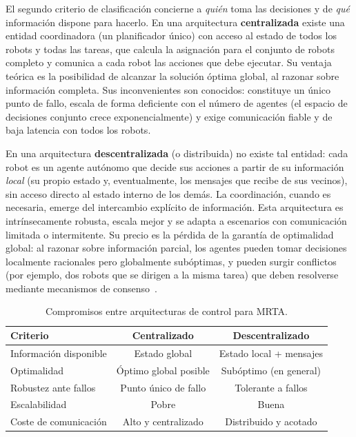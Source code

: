 El segundo criterio de clasificación concierne a \emph{quién} toma las decisiones y de \emph{qué} información dispone para hacerlo. En una arquitectura \textbf{centralizada} existe una entidad coordinadora (un planificador único) con acceso al estado de todos los robots y todas las tareas, que calcula la asignación para el conjunto de robots completo y comunica a cada robot las acciones que debe ejecutar. Su ventaja teórica es la posibilidad de alcanzar la solución óptima global, al razonar sobre información completa. Sus inconvenientes son conocidos: constituye un único punto de fallo, escala de forma deficiente con el número de agentes (el espacio de decisiones conjunto crece exponencialmente) y exige comunicación fiable y de baja latencia con todos los robots.

En una arquitectura \textbf{descentralizada} (o distribuida) no existe tal entidad: cada robot es un agente autónomo que decide sus acciones a partir de su información \emph{local} (su propio estado y, eventualmente, los mensajes que recibe de sus vecinos), sin acceso directo al estado interno de los demás. La coordinación, cuando es necesaria, emerge del intercambio explícito de información. Esta arquitectura es intrínsecamente robusta, escala mejor y se adapta a escenarios con comunicación limitada o intermitente. Su precio es la pérdida de la garantía de optimalidad global: al razonar sobre información parcial, los agentes pueden tomar decisiones localmente racionales pero globalmente subóptimas, y pueden surgir conflictos (por ejemplo, dos robots que se dirigen a la misma tarea) que deben resolverse mediante mecanismos de consenso~\cite{dias2006market}. 

\begin{table}[t] \centering \caption{Compromisos entre arquitecturas de control para MRTA.} \label{tab:cent-vs-desc} \begin{tabular}{lcc} \hline \textbf{Criterio} & \textbf{Centralizado} & \textbf{Descentralizado} \\ \hline Información disponible      & Estado global & Estado local + mensajes \\ Optimalidad         & Óptimo global posible & Subóptimo (en general) \\ Robustez ante fallos        & Punto único de fallo  & Tolerante a fallos \\ Escalabilidad       & Pobre         & Buena \\ Coste de comunicación       & Alto y centralizado   & Distribuido y acotado \\ \hline \end{tabular} \end{table}

